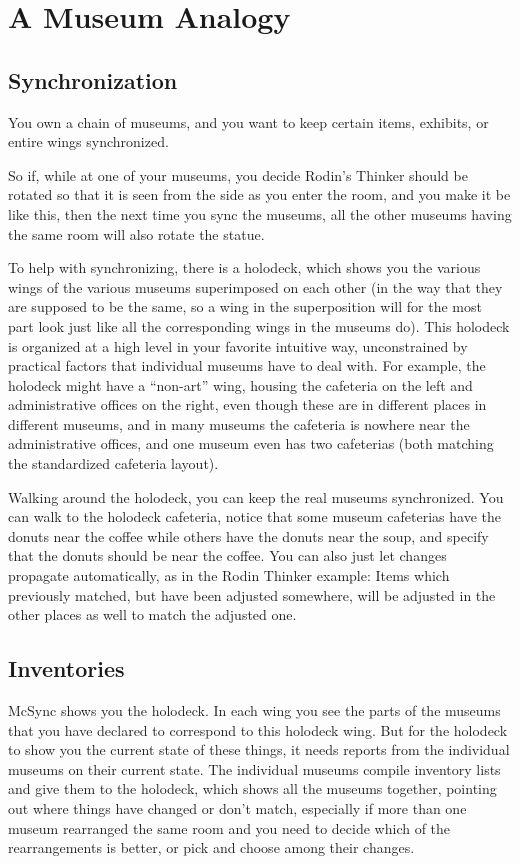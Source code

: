 \documentclass{book}
\begin{document}
\chapter{A Museum Analogy}\label{chap:museum}


\section{Synchronization}

You own a chain of museums, and you want to keep certain items, exhibits, or entire wings synchronized.

So if, while at one of your museums, you decide Rodin's Thinker should be rotated so that it is seen from the side as you enter the room, and you make it be like this, then the next time you sync the museums, all the other museums having the same room will also rotate the statue.

To help with synchronizing, there is a holodeck, which shows you the various wings of the various museums superimposed on each other (in the way that they are supposed to be the same, so a wing in the superposition will for the most part look just like all the corresponding wings in the museums do).  This holodeck is organized at a high level in your favorite intuitive way, unconstrained by practical factors that individual museums have to deal with.  For example, the holodeck might have a ``non-art'' wing, housing the cafeteria on the left and administrative offices on the right, even though these are in different places in different museums, and in many museums the cafeteria is nowhere near the administrative offices, and one museum even has two cafeterias (both matching the standardized cafeteria layout).

Walking around the holodeck, you can keep the real museums synchronized.  You can walk to the holodeck cafeteria, notice that some museum cafeterias have the donuts near the coffee while others have the donuts near the soup, and specify that the donuts should be near the coffee.  You can also just let changes propagate automatically, as in the Rodin Thinker example:  Items which previously matched, but have been adjusted somewhere, will be adjusted in the other places as well to match the adjusted one.
\section{Inventories}

McSync shows you the holodeck.  In each wing you see the parts of the museums that you have declared to correspond to this holodeck wing.  But for the holodeck to show you the current state of these things, it needs reports from the individual museums on their current state.  The individual museums compile inventory lists and give them to the holodeck, which shows all the museums together, pointing out where things have changed or don't match, especially if more than one museum rearranged the same room and you need to decide which of the rearrangements is better, or pick and choose among their changes.
\end{document}
